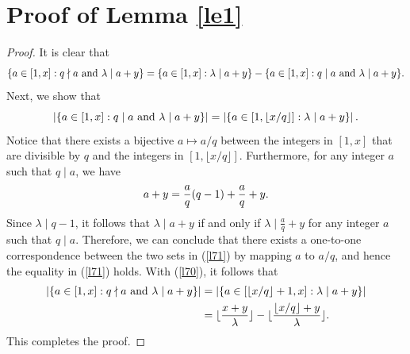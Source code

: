 \documentclass[journal,onecolumn]{IEEEtran}
\begin{document}
\section{Proof of Lemma \ref{le1}}
\begin{proof}
It is clear that \begin{equation}\label{l70}
    \{a\in [1,x]: q\nmid a \hbox{ and }\lambda\mid a+y \}= \{a\in [1,x]: \lambda\mid a+y \}-\{a\in [1,x]: q\mid a \hbox{ and }\lambda\mid a+y \}.
\end{equation}
Next, we show that 
\begin{equation}\label{l71}
 \left|   \{a\in [1,x]: q\mid a \hbox{ and }\lambda\mid a+y\}\right|=\left |\left\{a\in \left[1,\lfloor {x}/{q}\rfloor\right]: \lambda\mid a+y\right\}\right|.
\end{equation}
Notice that there exists a bijective $a\mapsto{a}/{q}$ between the integers in $[1,x]$ that are divisible by $q$ and the integers in $\left[1,\lfloor x/q \rfloor\right]$. Furthermore, for any integer $a$ such that $q\mid a$, we have 
\begin{equation}\notag
    a+y=\frac{a}{q}(q-1)+\frac{a}{q}+y.
\end{equation}
Since $\lambda\mid q-1$, it follows that $\lambda\mid a+y$ if and only if $\lambda\mid \frac{a}{q}+y$ for any integer $a$ such that $q\mid a$. Therefore, we can conclude that there exists a one-to-one correspondence between the two sets in (\ref{l71}) by mapping $a$ to ${a}/{q}$, and hence the equality in (\ref{l71}) holds. 
With (\ref{l70}), it follows that 
\begin{equation}\notag
\begin{split}
     \left| \{a\in [1,x]: q\nmid a \hbox{ and }\lambda\mid a+y \}\right|&= \left| \{a\in \left[\lfloor x/q\rfloor+1,x\right]:  \lambda\mid a+y \}\right| \\
     &=\lfloor \frac{x+y}{\lambda}\rfloor -\lfloor\frac{\lfloor {x}/{q}\rfloor+y}{\lambda} \rfloor.
\end{split}
\end{equation}
This completes the proof.
 \end{proof}
\end{document}
